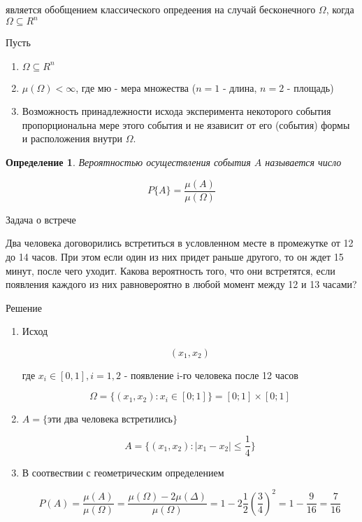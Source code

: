 \documentclass[a4paper, 14pt]{report}
\newtheorem{defenition}{Определение}[chapter]
\begin{document}
является обобщением классического опредеения на случай бесконечного $\Omega$, когда $\Omega \subseteq R^n$

Пусть

\begin{enumerate}
    \item $\Omega \subseteq R^n$
    \item $\mu(\Omega) < \infty$, где мю - мера множества ($n=1$ - длина, $n=2$ - площадь)
    \item Возможность принадлежности исхода эксперимента некоторого события пропорциональна мере этого события и не язависит от его (события) формы и расположения внутри $\Omega$.
\end{enumerate}

\begin{defenition}
    Вероятностью осуществления события $A$ называется число

    $$
    P\{A\} = \frac{\mu(A)}{\mu(\Omega)}
    $$
\end{defenition}

Задача о встрече

Два человека договорились встретиться в условленном месте в промежутке от 12 до 14 часов. При этом если один из них придет раньше другого, то он ждет 15 минут, после чего уходит. Какова вероятность того, что они встретятся, если появления каждого из них равновероятно в любой момент между 12 и 13 часами?

Решение

\begin{enumerate}
    \item Исход

        $$
        (x_1,x_2)
        $$

        где $x_i \in [0,1], i = 1,2$ - появление i-го человека после 12 часов

        $$
        \Omega = \{ (x_1,x_2) : x_i \in [0;1]\} = [0;1] \times [0;1]
        $$

    \item $A = \{\text{эти два человека встретились}\}$

        $$
        A = \{ (x_1,x_2) : |x_1-x_2| \le \frac{1}{4}\}
        $$

    \item В соотвествии с геометрическим определением

        $$
        P(A) = \frac{\mu(A)}{\mu(\Omega)} = \frac{\mu(\Omega) - 2 \mu(\Delta)}{\mu(\Omega)} = 1 - 2 \frac{1}{2} (\frac{3}{4})^2 = 1 - \frac{9}{16} = \frac{7}{16}
        $$
\end{enumerate}
\end{document}

